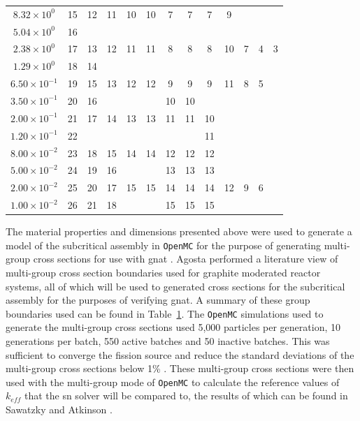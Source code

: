 \begin{table}[H]
\begin{tabular}{|c|cccccccccccc|}
         $8.32\times 10^{0}$  & 15 & 12 & 11 & 10 & 10 & 7  & 7  & 7  & 9  &   &   &  \\
         $5.04\times 10^{0}$  & 16 &    &    &    &    &    &    &    &    &   &   &  \\
         $2.38\times 10^{0}$  & 17 & 13 & 12 & 11 & 11 & 8  & 8  & 8  & 10 & 7 & 4 & 3\\
         $1.29\times 10^{0}$  & 18 & 14 &    &    &    &    &    &    &    &   &   &  \\
         $6.50\times 10^{-1}$ & 19 & 15 & 13 & 12 & 12 & 9  & 9  & 9  & 11 & 8 & 5 &  \\
         $3.50\times 10^{-1}$ & 20 & 16 &    &    &    & 10 & 10 &    &    &   &   &  \\
         $2.00\times 10^{-1}$ & 21 & 17 & 14 & 13 & 13 & 11 & 11 & 10 &    &   &   &  \\
         $1.20\times 10^{-1}$ & 22 &    &    &    &    &    &    & 11 &    &   &   &  \\
         $8.00\times 10^{-2}$ & 23 & 18 & 15 & 14 & 14 & 12 & 12 & 12 &    &   &   &  \\
         $5.00\times 10^{-2}$ & 24 & 19 & 16 &    &    & 13 & 13 & 13 &    &   &   &  \\
         $2.00\times 10^{-2}$ & 25 & 20 & 17 & 15 & 15 & 14 & 14 & 14 & 12 & 9 & 6 &  \\
         $1.00\times 10^{-2}$ & 26 & 21 & 18 &    &    & 15 & 15 & 15 &    &   &   &  \\
         \hline
    \end{tabular}
    \label{table:subcritical_group_bnds}
\end{table}
The material properties and dimensions presented above were used to generate a model of the subcritical assembly in \texttt{OpenMC} \cite{openmc} for the purpose of generating multi-group cross sections for use with \acrshort{gnat} \cite{ks_2024_subcritical}. Agosta \cite{agosta_htgr} performed a literature view of multi-group cross section boundaries used for graphite moderated reactor systems, all of which will be used to generated cross sections for the subcritical assembly for the purposes of verifying \acrshort{gnat}. A summary of these group boundaries used can be found in Table~\ref{table:subcritical_group_bnds}. The \texttt{OpenMC} simulations used to generate the multi-group cross sections used 5,000 particles per generation, 10 generations per batch, 550 active batches and 50 inactive batches. This was sufficient to converge the fission source and reduce the standard deviations of the multi-group cross sections below 1\% \cite{ks_2024_subcritical}. These multi-group cross sections were then used with the multi-group mode of \texttt{OpenMC} to calculate the reference values of $k_{eff}$ that the \acrshort{sn} solver will be compared to, the results of which can be found in Sawatzky and Atkinson \cite{ks_2024_subcritical}.

